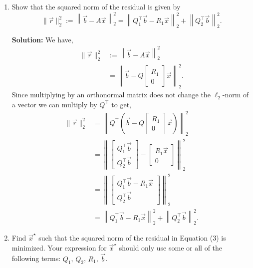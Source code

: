 \documentclass[10pt]{article}
\begin{document}
\begin{enumerate}[label=(\alph*)]
    \item Show that the squared norm of the residual is given by
    \begin{equation}
        \|\vec{r}\|_2^2 := \left\| \vec{b} - A\vec{x} \right\|_2^2 = \left\| Q_1^\top \vec{b} - R_1 \vec{x} \right\|_2^2 + \left\| Q_2^\top \vec{b} \right\|_2^2.
    \end{equation}

    \textbf{Solution:} We have,
    \begin{align}
        \|\vec{r}\|_2^2 &:= \left\| \vec{b} - A\vec{x} \right\|_2^2 \\
        &= \left\| \vec{b} - Q \begin{bmatrix} R_1 \\ 0 \end{bmatrix} \vec{x} \right\|_2^2.
    \end{align}
    Since multiplying by an orthonormal matrix does not change the $\ell_2$-norm of a vector we can multiply by $Q^\top$ to get,
    \begin{align}
        \|\vec{r}\|_2^2 &= \left\| Q^\top \left( \vec{b} - Q \begin{bmatrix} R_1 \\ 0 \end{bmatrix} \vec{x} \right) \right\|_2^2 \\
        &= \left\| \begin{bmatrix} Q_1^\top \vec{b} \\ Q_2^\top \vec{b} \end{bmatrix} - \begin{bmatrix} R_1 \vec{x} \\ 0 \end{bmatrix} \right\|_2^2 \\
        &= \left\| \begin{bmatrix} Q_1^\top \vec{b} - R_1 \vec{x} \\ Q_2^\top \vec{b} \end{bmatrix} \right\|_2^2 \\
        &= \left\| Q_1^\top \vec{b} - R_1 \vec{x} \right\|_2^2 + \left\| Q_2^\top \vec{b} \right\|_2^2.
    \end{align}

    \item Find $\vec{x}^\star$ such that the squared norm of the residual in Equation (3) is minimized. Your expression for $\vec{x}^\star$ should only use some or all of the following terms: $Q_1$, $Q_2$, $R_1$, $\vec{b}$.


\end{enumerate}
\end{document}
